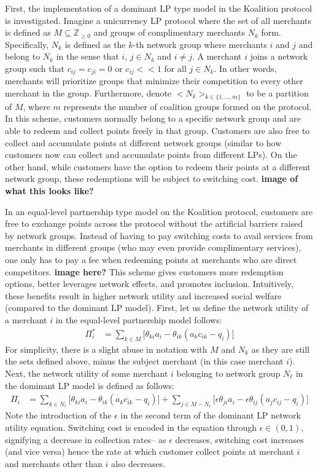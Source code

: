 First, the implementation of a dominant LP type model in the Koalition protocol is investigated. Imagine a unicurrency LP protocol where the set of all merchants is defined as $M \subseteq \mathbb{Z}_{\geq 0}$ and  
groups of complimentary merchants $N_k$ form. Specifically, $N_k$ is defined as the $k$-th network group where merchants $i$ and $j$ and belong to $N_k$ in the sense that $i$, $j \in N_k$ and $i \neq j$. A merchant $i$ joins a network group such that $c_{ij} = c_{ji} = 0$ or $c_{ij} << 1$ for all $j \in N_k$. In other words, merchants will prioritize groups that minimize their competition to every other merchant in the group. Furthermore, denote $<N_k>_{k \in \{1,...,m\}}$ to be a partition of $M$, where $m$ represents the number of coalition groups formed on the protocol. In this scheme, customers normally belong to a specific network group and are able to redeem and collect points freely in that group. Customers are also free to collect and accumulate points at different network groups (similar to how customers now can collect and accumulate points from different LPs). On the other hand, while customers have the option to redeem their points at a different network group, these redemptions will be subject to switching cost. \textbf{image of what this looks like?}

In an equal-level partnership type model on the Koalition protocol, customers are free to exchange points across the protocol without the artificial barriers raised by network groups. Instead of having to pay switching costs to avail services from merchants in different groups (who may even provide complimentary services), one only has to pay a fee when redeeming points at merchants who are direct competitors. \textbf{image here?} This scheme gives customers more redemption options, better leverages network effects, and promotes inclusion. Intuitively, these benefits result in higher network utility and increased social welfare (compared to the dominant LP model). First, let us define the network utility of a merchant $i$ in the equal-level partnership model follows:
%
\begin{align*}
\Pi_i^* & = \sum_{k \in M} \big[\theta_{ki}a_i - \theta_{ik}(a_k c_{ik} - q_i) \big]
\end{align*}
%
For simplicity, there is a slight abuse in notation with $M$ and $N_k$ as they are still the sets defined above, minus the subject merchant (in this case merchant $i$).  Next, the network utility of some merchant $i$ belonging to network group $N_\ell$ in the dominant LP model is defined as follows:
%
\begin{align*}
\Pi_i & = \sum_{k \in N_\ell} \big[\theta_{ki}a_i - \theta_{ik}(a_k c_{ik} - q_i) \big] + \sum_{j \in M - N_\ell} \big[\epsilon \theta_{ji}a_i - \epsilon \theta_{ij}(a_j  c_{ij} - q_i) \big]
\end{align*}
%
Note the introduction of the $\epsilon$ in the second term of the dominant LP network utility equation. Switching cost is encoded in the equation through $\epsilon \in (0,1)$, signifying a decrease in collection rates-- as $\epsilon$ decreases, switching cost increases (and vice versa) hence the rate at which customer collect points at merchant $i$ and merchants other than $i$ also decreases. 

